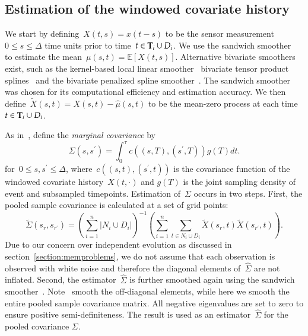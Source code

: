 \documentclass[11pt]{amsart}
\def\E{\mathcal{E}}
\def\E{\mathbb{E}}
\def\bfT{{\bf T}}
\begin{document}
\subsection{Estimation of the windowed covariate history}

We start by defining~$X(t,s) = x(t-s)$ to be the sensor measurement~$0
\leq s \leq \Delta$ time units prior to time~$t \in \bfT_i \cup D_i$.
We use the sandwich smoother~\citep{Xiao2013} to estimate the
mean~$\mu(s,t) = \E [ X(t,s)]$.
Alternative bivariate smoothers exist, such as the kernel-based local
linear smoother~\citep{Hastie2009} bivariate tensor product
splines~\citep{Wood2006} and the bivariate penalized spline
smoother~\citep{MarxEilers2005}.
The sandwich smoother was chosen for its computational efficiency and
estimation accuracy.
We then define~$\tilde X(s,t) = X(s,t) - \hat \mu(s,t)$ to be the
mean-zero process at each time~$t \in \bfT_i \cup D_i$.

As in~\cite{Park2018}, define the \emph{marginal covariance} by
\[
\Sigma (s, s^\prime) = \int_{0}^\tau c( (s,T), (s^\prime, T) ) g(T) dt.
\]
for~$0 \leq s,s^\prime \leq \Delta$, where~$c((s,t), (s^\prime,t))$ is
the covariance function of the windowed covariate history~$X(t,\cdot)$
and $g(T)$ is the joint sampling density of event and subsampled
timepoints. 
Estimation of~$\Sigma$ occurs in two steps. 
First, the pooled sample covariance is calculated at a set of grid
points:
\[
\tilde \Sigma (s_r , s_{r^\prime}) = \left( \sum_{i=1}^n \left | N_i 
    \cup D_i \right |\right)^{-1} \left( \sum_{i=1}^n \sum_{t \in N_i
    \cup D_i} \tilde X (s_r,t) \tilde X (s_{r^\prime}, t) \right).
\]
Due to our concern over independent evolution as discussed in
section~\ref{section:memproblems}, we do not assume that each
observation is observed with white noise and therefore the diagonal
elements of~$\hat \Sigma$ are not inflated. Second, the
estimator~$\hat \Sigma$ is further smoothed again using the sandwich 
smoother~\citep{Xiao2013}. 
Note~\cite{Park2018} smooth the off-diagonal elements, while here we
smooth the entire pooled sample covariance matrix. All negative
eigenvalues are set to zero to ensure positive semi-definiteness.
The result is used as an estimator~$\hat \Sigma$ for the pooled
covariance $\Sigma$.
\end{document}
